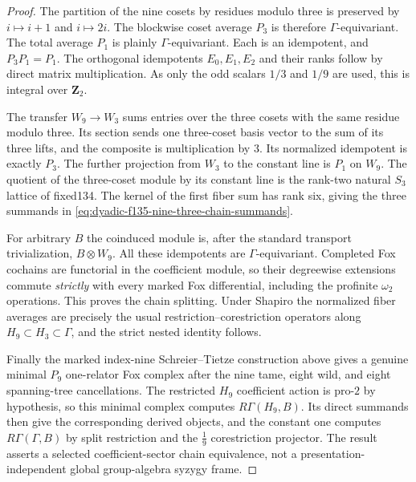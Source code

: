 \begin{proof}
The partition
of the nine
cosets by residues
modulo three is
preserved by
$i\mapsto i+1$
and $i\mapsto2i$.
The blockwise
coset average
$P_3$ is therefore
$\Gamma$-equivariant.
The total
average $P_1$
is plainly
$\Gamma$-equivariant.
Each is an
idempotent,
and
$P_3P_1=P_1$.
The orthogonal
idempotents
$E_0,E_1,E_2$
and their ranks
follow by direct
matrix multiplication.
As only the
odd scalars
$1/3$ and
$1/9$ are used,
this is integral
over $\mathbf Z_2$.

The transfer
$W_9\to W_3$
sums entries
over the three
cosets with the
same residue
modulo three.
Its section
sends one
three-coset basis
vector to the
sum of its
three lifts,
and the composite
is multiplication
by $3$.
Its normalized
idempotent is
exactly $P_3$.
The further
projection from
$W_3$ to the
constant line
is $P_1$ on
$W_9$.
The quotient
of the
three-coset
module by its
constant line
is the
rank-two natural
$S_3$ lattice
of fixed134.
The kernel of
the first
fiber sum has
rank six,
giving the
three summands
in
\eqref{eq:dyadic-f135-nine-three-chain-summands}.

For arbitrary
$B$ the
coinduced module
is, after the
standard transport
trivialization,
$B\otimes W_9$.
All these
idempotents are
$\Gamma$-equivariant.
Completed Fox
cochains are
functorial in
the coefficient
module, so their
degreewise
extensions commute
\emph{strictly}
with every
marked Fox
differential,
including the
profinite
$\omega_2$
operations.
This proves the
chain splitting.
Under Shapiro
the normalized
fiber averages
are precisely
the usual
restriction--corestriction
operators along
$H_9\subset H_3
\subset\Gamma$,
and the strict
nested identity
follows.

Finally the
marked index-nine
Schreier--Tietze
construction above
gives a genuine
minimal $P_9$
one-relator
Fox complex
after the
nine tame,
eight wild,
and eight
spanning-tree
cancellations.
The restricted
$H_9$ coefficient
action is pro-$2$
by hypothesis,
so this minimal
complex computes
$R\Gamma(H_9,B)$.
Its direct
summands then
give the
corresponding
derived objects,
and the constant
one computes
$R\Gamma(\Gamma,B)$
by split restriction
and the
$\frac19$
corestriction
projector.
The result
asserts a
selected
coefficient-sector
chain equivalence,
not a
presentation-independent
global group-algebra
syzygy frame.
\end{proof}

